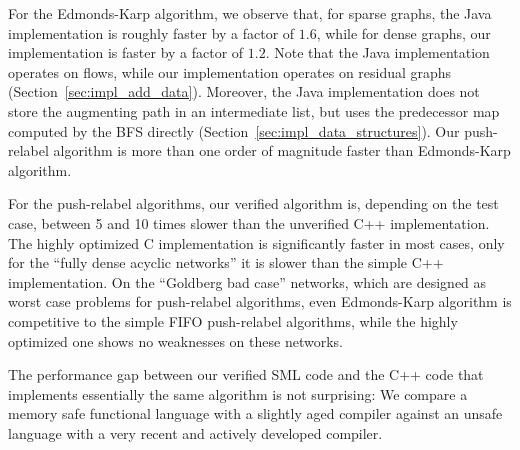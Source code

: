 \documentclass[smallcondensed]{svjour3}     %
\begin{document}
  For the Edmonds-Karp algorithm, we observe that, for sparse graphs, the Java implementation is roughly faster by a factor of $1.6$, while for dense graphs, 
  our implementation is faster by a factor of $1.2$. Note that the Java implementation operates on flows, while our implementation 
  operates on residual graphs (\cf Section~\ref{sec:impl_add_data}). Moreover, the Java implementation does not store the augmenting 
  path in an intermediate list, but uses the predecessor map computed by the BFS directly (\cf Section~\ref{sec:impl_data_structures}).
  Our push-relabel algorithm is more than one order of magnitude faster than Edmonds-Karp algorithm.
  
  For the push-relabel algorithms, our verified algorithm is, depending on the test case, between 5 and 10 times slower than the unverified C++ implementation.
  The highly optimized C implementation is significantly faster in most cases, only for the ``fully dense acyclic networks'' it is slower than the 
  simple C++ implementation.
  On the ``Goldberg bad case'' networks, which are designed as worst case problems for push-relabel algorithms, 
  even Edmonds-Karp algorithm is competitive to the simple FIFO push-relabel algorithms, while the highly optimized one shows no weaknesses on these networks.
  
  The performance gap between our verified SML code and the C++ code that implements essentially the same algorithm is not surprising: We compare a 
  memory safe functional language with a slightly aged compiler against an unsafe language with a very recent and actively developed compiler.
  

% 
%   
  
\end{document}
